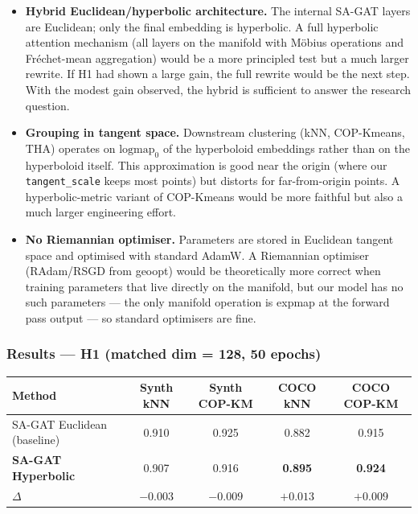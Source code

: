 \begin{itemize}
    \item \textbf{Hybrid Euclidean/hyperbolic architecture.} The internal SA-GAT layers are Euclidean; only the final embedding is hyperbolic. A full hyperbolic attention mechanism (all layers on the manifold with M\"obius operations and Fr\'echet-mean aggregation) would be a more principled test but a much larger rewrite. If H1 had shown a large gain, the full rewrite would be the next step. With the modest gain observed, the hybrid is sufficient to answer the research question.
    \item \textbf{Grouping in tangent space.} Downstream clustering (kNN, COP-Kmeans, THA) operates on $\text{logmap}_0$ of the hyperboloid embeddings rather than on the hyperboloid itself. This approximation is good near the origin (where our \texttt{tangent\_scale} keeps most points) but distorts for far-from-origin points. A hyperbolic-metric variant of COP-Kmeans would be more faithful but also a much larger engineering effort.
    \item \textbf{No Riemannian optimiser.} Parameters are stored in Euclidean tangent space and optimised with standard AdamW. A Riemannian optimiser (RAdam/RSGD from geoopt) would be theoretically more correct when training parameters that live directly on the manifold, but our model has no such parameters --- the only manifold operation is expmap at the forward pass output --- so standard optimisers are fine.
\end{itemize}

\subsubsection{Results --- H1 (matched dim = 128, 50 epochs)}

\begin{tabular}{lcccc}
\hline
\textbf{Method} & \textbf{Synth kNN} & \textbf{Synth COP-KM} & \textbf{COCO kNN} & \textbf{COCO COP-KM} \\
\hline
SA-GAT Euclidean (baseline) & 0.910 & 0.925 & 0.882 & 0.915 \\
\textbf{SA-GAT Hyperbolic} & 0.907 & 0.916 & \textbf{0.895} & \textbf{0.924} \\
$\Delta$ & $-0.003$ & $-0.009$ & $\mathbf{+0.013}$ & $\mathbf{+0.009}$ \\
\hline
\end{tabular}

\vspace{0.5em}

